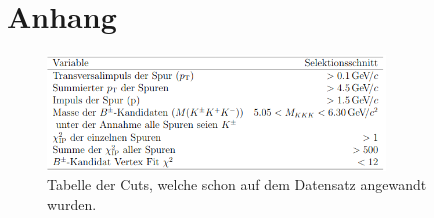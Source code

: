 \section{Anhang}

\begin{figure}[htb]
  \centering
  \includegraphics[width=0.8\textwidth]{plots/tabelle_cuts.png}
  \caption{Tabelle der Cuts, welche schon auf dem Datensatz angewandt wurden.}
  \label{tab:cuts}
\end{figure}
